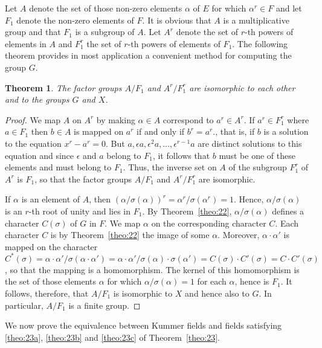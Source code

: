 \documentclass[10pt,leqno]{article}
\newtheorem{theo}{Theorem}
\theoremstyle{definition}
\begin{document}
Let $A$ denote the set of those non-zero elements $\alpha$ of $E$ for which $\alpha^r \in F$ and let $F_1$ denote the non-zero elements of $F$.
It is obvious that $A$ is a multiplicative group and that $F_1$ is a subgroup of $A$.
Let $A^r$ denote the set of $r$-th powers of elements in $A$ and $F_1^r$ the set of $r$-th powers of elements of $F_1$.
The following theorem provides in most application a convenient method for computing the group $G$.


\begin{theo}
\label{theo:24}
The factor groups $A/F_1$ and $A^r/F_1^r$ are isomorphic to each other and to the groups $G$ and $X$.
\end{theo}

\begin{proof}
We map $A$ on $A^r$ by making $\alpha \in A$ correspond to $a^r \in A^r$.
If $a^r \in F_1^r$ where $a \in F_1$ then $b \in A$ is mapped on $a^r$ if and only if $b^r = a^r$., that is, if $b$ is a solution to the equation $x^r - a^r = 0$.
But $a, \epsilon a, \epsilon^2 a, \ldots, \epsilon^{r-1} a$ are distinct solutions to this equation and since $\epsilon$ and $a$ belong to $F_1$, it follows that $b$ must be one of these elements and must belong to $F_1$.
Thus, the inverse set on $A$ of the subgroup $F_1^r$ of $A^r$ is $F_1$, so that the factor groups $A/F_1$ and $A^r/F_1^r$ are isomorphic.

If $\alpha$ is an element of $A$, then $(\alpha / \sigma(\alpha))^r = \alpha^r / \sigma(\alpha^r) = 1$.
Hence, $\alpha / \sigma(\alpha)$ is an $r$-th root of unity and lies in $F_1$.
By Theorem~\ref{theo:22}, $\alpha / \sigma(\alpha)$ defines a character $C(\sigma)$ of $G$ in $F$.
We map $\alpha$ on the corresponding character $C$.
Each character $C$ is by Theorem~\ref{theo:22} the image of some $\alpha$.
Moreover, $\alpha \cdot \alpha'$ is mapped on the character $C^*(\sigma) = \alpha \cdot \alpha' / \sigma(\alpha \cdot \alpha') = \alpha \cdot \alpha' / \sigma(\alpha) \cdot \sigma(\alpha') = C(\sigma) \cdot C'(\sigma) = C \cdot C'(\sigma)$, so that the mapping is a homomorphism.
The kernel of this homomorphism is the set of those elements $\alpha$ for which $\alpha / \sigma(\alpha) = 1$ for each $\alpha$, hence is $F_1$.
It follows, therefore, that $A / F_1$ is isomorphic to $X$ and hence also to $G$.
In particular, $A/F_1$ is a finite group.
\end{proof}


We now prove the equivalence between Kummer fields and fields satisfying \eqref{theo:23a}, \eqref{theo:23b} and \eqref{theo:23c} of Theorem~\ref{theo:23}.
\end{document}
